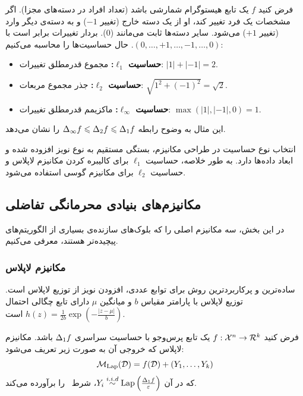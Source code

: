 \begin{مثال}
فرض کنید $f$ یک تابع هیستوگرام شمارشی باشد (تعداد افراد در دسته‌های مجزا). اگر مشخصات یک فرد تغییر کند، او از یک دسته خارج (تغییر $-1$) و به دسته‌ی دیگر وارد (تغییر $+1$) می‌شود. سایر دسته‌ها ثابت می‌مانند ($0$).
بردار تغییرات برابر است با $(0, \dots, +1, \dots, -1, \dots, 0)$. حال حساسیت‌ها را محاسبه می‌کنیم:
\begin{itemize}
    \item \textbf{حساسیت $\ell_1$:} مجموع قدرمطلق تغییرات: $|1| + |-1| = 2$.
    \item \textbf{حساسیت $\ell_2$:} جذر مجموع مربعات: $\sqrt{1^2 + (-1)^2} = \sqrt{2}$.
    \item \textbf{حساسیت $\ell_\infty$:} ماکزیمم قدرمطلق تغییرات: $\max(|1|, |-1|, 0) = 1$.
\end{itemize}
این مثال به وضوح رابطه $\Delta_\infty f \leqslant \Delta_2 f \leqslant \Delta_1 f$ را نشان می‌دهد.
\end{مثال}

انتخاب نوع حساسیت در طراحی مکانیزم، بستگی مستقیم به نوع نویز افزوده شده و ابعاد داده‌ها دارد. به طور خلاصه، حساسیت $\ell_1$ برای کالیبره کردن مکانیزم لاپلاس و حساسیت $\ell_2$ برای مکانیزم گوسی استفاده می‌شود.

\subsection{مکانیزم‌های بنیادی محرمانگی تفاضلی}
\label{sec:mechanisms}

در این بخش، سه مکانیزم اصلی را که بلوک‌های سازنده‌ی بسیاری از الگوریتم‌های پیچیده‌تر هستند، معرفی می‌کنیم.

\subsubsection{مکانیزم لاپلاس}
\label{sec:mech:laplace}

ساده‌ترین و پرکاربردترین روش برای توابع عددی، افزودن نویز از توزیع لاپلاس است. توزیع لاپلاس با پارامتر مقیاس $b$ و میانگین $\mu$ دارای تابع چگالی احتمال $h(z) = \frac{1}{2b} \exp\left(-\frac{|z-\mu|}{b}\right)$ است.

\begin{قضیه}
\label{thm:laplace-privacy}
فرض کنید $f: \Xset^n \to \Rset^k$ یک تابع پرس‌وجو با حساسیت سراسری $\Delta_1 f$ باشد. مکانیزم لاپلاس که خروجی آن به صورت زیر تعریف می‌شود:
\begin{equation}
\label{eq:laplace-mech}
\mech_{\mathrm{Lap}}(\Dset) = f(\Dset) + (Y_1, \dots, Y_k)
\end{equation}
که در آن $Y_i\overset{i.i.d}{\sim} \mathrm{Lap}\left(\frac{\Delta_1 f}{\varepsilon}\right)$، شرط \DP\ را برآورده می‌کند.
\end{قضیه}

